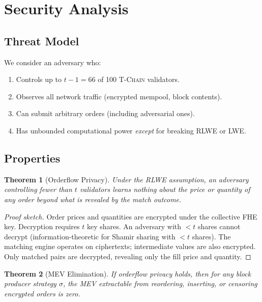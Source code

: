 \documentclass[11pt,letterpaper]{article}
\newtheorem{theorem}{Theorem}
\theoremstyle{definition}
\theoremstyle{remark}
\newcommand{\TChain}{\textsc{T-Chain}}
\newcommand{\FHE}{\textsc{FHE}}
\newcommand{\MEV}{\textsc{MEV}}
\begin{document}
\section{Security Analysis}
\label{sec:security}

\subsection{Threat Model}

We consider an adversary who:
\begin{enumerate}
    \item Controls up to $t - 1 = 66$ of 100 \TChain{} validators.
    \item Observes all network traffic (encrypted mempool, block contents).
    \item Can submit arbitrary orders (including adversarial ones).
    \item Has unbounded computational power \emph{except} for breaking \textsc{RLWE} or \textsc{LWE}.
\end{enumerate}

\subsection{Properties}

\begin{theorem}[Orderflow Privacy]
Under the \textsc{RLWE} assumption, an adversary controlling fewer than $t$ validators learns nothing about the price or quantity of any order beyond what is revealed by the match outcome.
\end{theorem}

\begin{proof}[Proof sketch]
Order prices and quantities are encrypted under the collective \FHE{} key. Decryption requires $t$ key shares. An adversary with $< t$ shares cannot decrypt (information-theoretic for Shamir sharing with $< t$ shares). The matching engine operates on ciphertexts; intermediate values are also encrypted. Only matched pairs are decrypted, revealing only the fill price and quantity.
\end{proof}

\begin{theorem}[MEV Elimination]
If orderflow privacy holds, then for any block producer strategy $\sigma$, the \MEV{} extractable from reordering, inserting, or censoring encrypted orders is zero.
\end{theorem}
\end{document}
